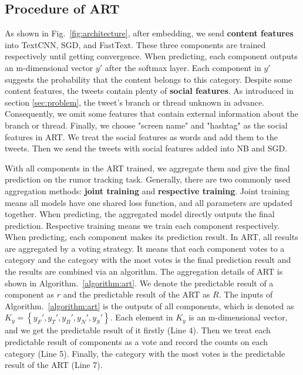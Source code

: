 \subsection{Procedure of ART}
As shown in Fig.~\ref{fig:architecture}, after embedding, we send \textbf{content features} into TextCNN, SGD, and FastText. These three components are trained respectively until getting convergence. When predicting, each component outputs an m-dimensional vector $y'$ after the softmax layer. Each component in $y'$ suggests the probability that the content belongs to this category. Despite some content features, the tweets contain plenty of \textbf{social features}. As introduced in section \ref{sec:problem}, the tweet's branch or thread unknown in advance. Consequently, we omit some features that contain external information about the branch or thread. Finally, we choose "screen name" and "hashtag" as the social features in ART. We treat the social features as words and add them to the tweets. Then we send the tweets with social features added into NB and SGD. 

With all components in the ART trained, we aggregate them and give the final prediction on the rumor tracking task. Generally, there are two commonly used aggregation methods: \textbf{joint training} and \textbf{respective training}. Joint training means all models have one shared loss function, and all parameters are updated together. When predicting, the aggregated model directly outputs the final prediction. Respective training means we train each component respectively. When predicting, each component makes its prediction result. In ART, all results are aggregated by a voting strategy. It means that each component votes to a category and the category with the most votes is the final prediction result and the results are combined via an algorithm. The aggregation details of ART is shown in Algorithm.~\ref{algorithm:art}. We denote the predictable result of a component as $r$ and the predictable result of the ART as $R$. The inputs of Algorithm.~\ref{algorithm:art} is the outputs of all components, which is denoted as $K_y = \left\{y_F', y_T', y_B', y_N', y_S' \right\}$. Each element in $K_y$ is an m-dimensional vector, and we get the predictable result of it firstly (Line 4). Then we treat each predictable result of components as a vote and record the counts on each category (Line 5). Finally, the category with the most votes is the predictable result of the ART (Line 7). 
